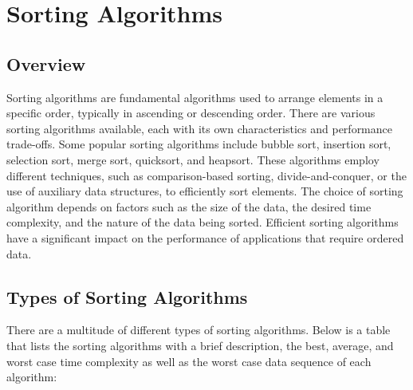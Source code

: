 \section*{Sorting Algorithms}

\subsection*{Overview}

Sorting algorithms are fundamental algorithms used to arrange elements in a specific order, typically in ascending or descending order. There are various sorting algorithms available, each with its 
own characteristics and performance trade-offs. Some popular sorting algorithms include bubble sort, insertion sort, selection sort, merge sort, quicksort, and heapsort. These algorithms employ different 
techniques, such as comparison-based sorting, divide-and-conquer, or the use of auxiliary data structures, to efficiently sort elements. The choice of sorting algorithm depends on factors such as the size 
of the data, the desired time complexity, and the nature of the data being sorted. Efficient sorting algorithms have a significant impact on the performance of applications that require ordered data.

\subsection*{Types of Sorting Algorithms}

There are a multitude of different types of sorting algorithms. Below is a table that lists the sorting algorithms with a brief description, the best, average, and worst case time complexity as well as the
worst case data sequence of each algorithm:

